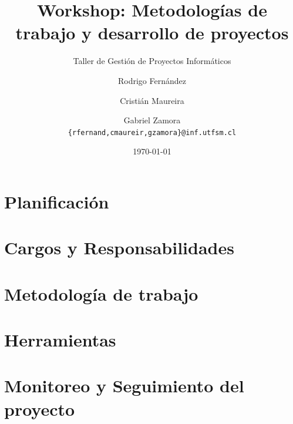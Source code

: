 \documentclass{beamer}
\title{Workshop: Metodologías de trabajo y desarrollo de proyectos}
\subtitle{Taller de Gestión de Proyectos Informáticos}
\author[R. Fernández, C. Maureira, G. Zamora]{Rodrigo Fernández \and Cristián Maureira \and Gabriel Zamora\\ \small{\texttt{\{rfernand,cmaureir,gzamora\}@inf.utfsm.cl}}}
\institute[]{Universidad Técnica Federico Santa María}
\date{\today}
\begin{document}
    \frame{\titlepage}
    \frame{\tableofcontents}
	\section{Planificación}
    
    \section{Cargos y Responsabilidades}
    
    \section{Metodología de trabajo}
    
    \section{Herramientas}
    
    \section{Monitoreo y Seguimiento del proyecto}
    
\end{document}

